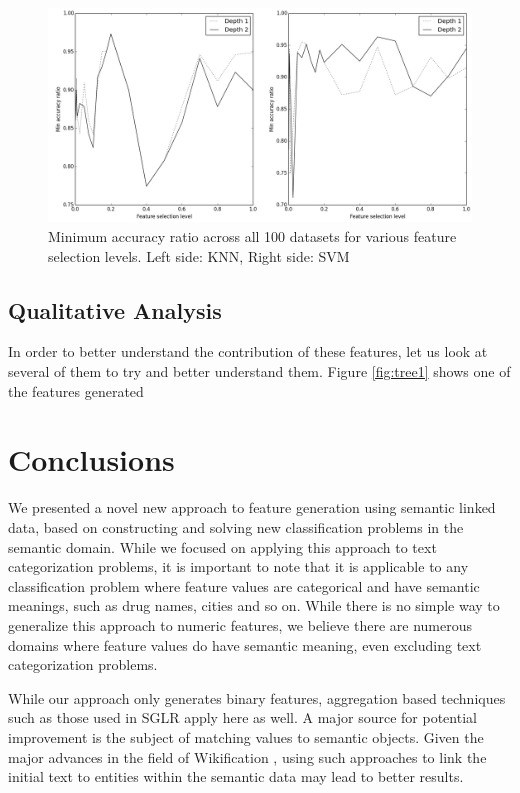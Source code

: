 \documentclass{article}
\theoremstyle{definition}
\begin{document}
\begin{figure}[H]
	\centering
	\includegraphics[width=\linewidth]{ratios_min.png}
	\caption{Minimum accuracy ratio across all 100 datasets for various feature selection levels. Left side: KNN, Right side: SVM}
	\label{fig:ratios_min}
\end{figure}


\subsection{Qualitative Analysis}
In order to better understand the contribution of these features, let us look at several of them to try and better understand them. Figure \ref{fig:tree1} shows one of the features generated %


\section{Conclusions}
We presented a novel new approach to feature generation using semantic linked data, based on constructing and solving new classification problems in the semantic domain. While we focused on applying this approach to text categorization problems, it is important to note that it is applicable to any classification problem where feature values are categorical and have semantic meanings, such as drug names, cities and so on. While there is no simple way to generalize this approach to numeric features, we believe there are numerous domains where feature values do have semantic meaning, even excluding text categorization problems.

While our approach only generates binary features, aggregation based techniques such as those used in SGLR apply here as well. A major source for potential improvement is the subject of matching values to semantic objects. Given the major advances in the field of Wikification \citep{bunescu2006using, cheng2013relational}, using such approaches to link the initial text to entities within the semantic data may lead to better results.
\end{document}
